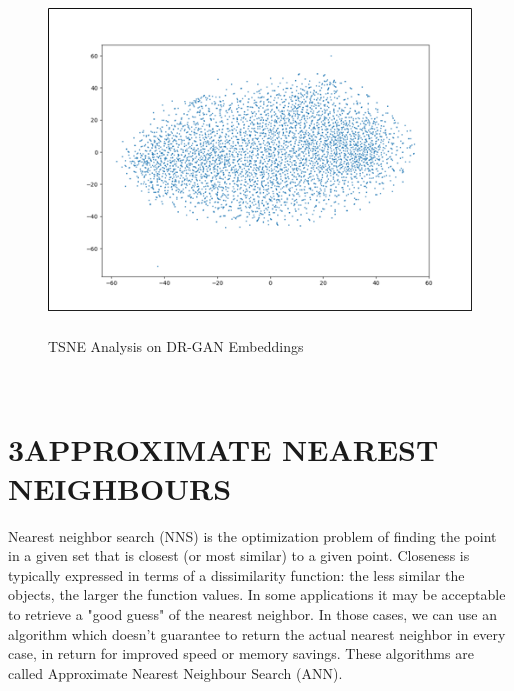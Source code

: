 \documentclass[12pt]{article}
\renewcommand{\_}{\kern-1.5pt\textunderscore\kern-1.5pt}
\begin{document}
\vspace{\baselineskip}
\begin{Center}



\begin{figure}[H]
	\begin{Center}
		\includegraphics[width=5.04in,height=3.6in]{./media/image3.png}
		\caption{TSNE Analysis on DR-GAN Embeddings}
		\label{fig:TSNE_Analysis_on_DRGAN_Embeddings}
	\end{Center}
\end{figure}



\\

\end{Center}\par

\section*{3\hspace*{10pt}APPROXIMATE NEAREST NEIGHBOURS}
\begin{justify}
Nearest neighbor search (NNS) is the optimization problem of finding the point in a given set that is closest (or most similar) to a given point. Closeness is typically expressed in terms of a dissimilarity function: the less similar the objects, the larger the function values. In some applications it may be acceptable to retrieve a "good guess" of the nearest neighbor. In those cases, we can use an algorithm which doesn't guarantee to return the actual nearest neighbor in every case, in return for improved speed or memory savings. These algorithms are called Approximate Nearest Neighbour Search (ANN).
\end{justify}\par
\end{document}
